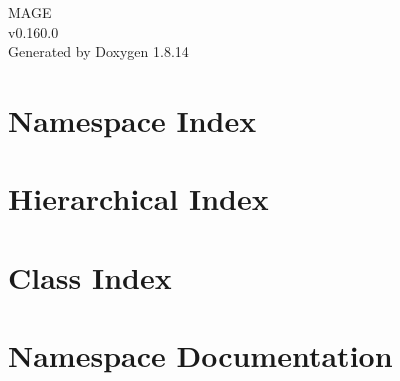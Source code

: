 \documentclass[twoside]{book}
\newcommand{\+}{\discretionary{\mbox{\scriptsize$\hookleftarrow$}}{}{}}
\newcommand{\clearemptydoublepage}{%
  \newpage{\pagestyle{empty}\cleardoublepage}%
}
\begin{document}
\hypersetup{pageanchor=false,
             bookmarksnumbered=true,
             pdfencoding=unicode
            }
\begin{titlepage}
\vspace*{7cm}
\begin{center}%
{\Large M\+A\+GE \\[1ex]\large v0.\+160.\+0 }\\
\vspace*{1cm}
{\large Generated by Doxygen 1.8.14}\\
\end{center}
\end{titlepage}
\clearemptydoublepage
{}
\tableofcontents
\clearemptydoublepage
{}
\hypersetup{pageanchor=true}

\chapter{Namespace Index}

\chapter{Hierarchical Index}

\chapter{Class Index}

\chapter{Namespace Documentation}




























\end{document}
